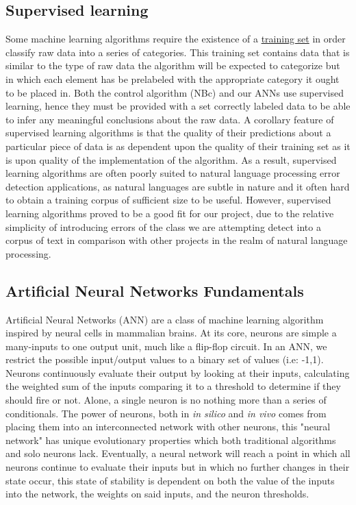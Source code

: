 \documentclass{article}
\begin{document}
\subsection{Supervised learning}
Some machine learning algorithms require the existence of a \underline{training set} in order classify raw data into a series of categories. This training set contains data that is similar to the type of raw data the algorithm will be expected to categorize but in which each element has be prelabeled with the appropriate category it ought to be placed in. Both the control algorithm (NBc) and our ANNs use supervised learning, hence they must be provided with a set correctly labeled data to be able to infer any meaningful conclusions about the raw data. A corollary feature of supervised learning algorithms is that the quality of their predictions about a particular piece of data is as dependent upon the quality of their training set as it is upon quality of the implementation of the algorithm. As a result, supervised learning algorithms are often poorly suited to natural language processing error detection applications, as natural languages are subtle in nature and it often hard to obtain a training corpus of sufficient size to be useful.
However, supervised learning algorithms proved to be a good fit for our project, due to the relative simplicity of introducing errors of the class we are attempting detect into a corpus of text in comparison with other projects in the realm of natural language processing. 
\subsection{Artificial Neural Networks Fundamentals}
Artificial Neural Networks (ANN) are a class of machine learning algorithm inspired by neural cells in mammalian brains. At its core, neurons are simple a many-inputs to one output unit, much like a flip-flop circuit. In an ANN, we restrict the possible input/output values to a binary set of values (i.e: -1,1). 
Neurons continuously evaluate their output by looking at their inputs, calculating the weighted sum of the inputs comparing it to a threshold to determine if they should fire or not. Alone, a single neuron is no nothing more than a series of conditionals. The power of neurons, both in \textit{in silico} and \textit{in vivo} comes from placing them into an interconnected network with other neurons, this "neural network" has unique evolutionary properties which both traditional algorithms and solo neurons lack. Eventually, a neural network will reach a point in which all neurons continue to evaluate their inputs but in which no further changes in their state occur, this state of stability is dependent on both the value of the inputs into the network, the weights on said inputs, and the neuron thresholds. 
\end{document}
